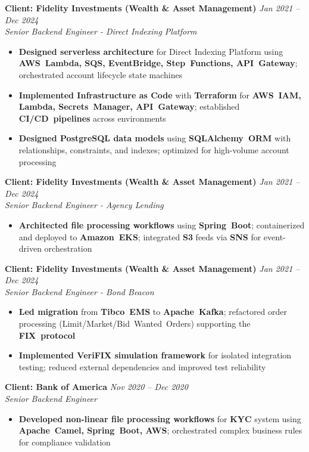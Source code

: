 \documentclass[11pt,a4paper]{article}
\newcommand{\resumeItem}[1]{\item\small{#1}}
\newcommand{\resumeItemList}[1]{\begin{itemize}[leftmargin=0.5in, itemsep=0.25em, parsep=0pt, partopsep=0pt, topsep=0.25em]
    \small
    #1
\end{itemize}}
\begin{document}
\textbf{Client: Fidelity Investments (Wealth \& Asset Management)} \hfill \textit{Jan 2021 -- Dec 2024}\\
\textit{Senior Backend Engineer - Direct Indexing Platform}
\resumeItemList{
    \resumeItem{\textbf{Designed serverless architecture} for Direct Indexing Platform using \textbf{AWS~Lambda, SQS, EventBridge, Step~Functions, API~Gateway}; orchestrated account lifecycle state machines}
    \resumeItem{\textbf{Implemented Infrastructure as Code} with \textbf{Terraform} for \textbf{AWS~IAM, Lambda, Secrets~Manager, API~Gateway}; established \textbf{CI/CD~pipelines} across environments}
    \resumeItem{\textbf{Designed PostgreSQL data models} using \textbf{SQLAlchemy~ORM} with relationships, constraints, and indexes; optimized for high-volume account processing}
}
\vspace{0.4em}

\textbf{Client: Fidelity Investments (Wealth \& Asset Management)} \hfill \textit{Jan 2021 -- Dec 2024}\\
\textit{Senior Backend Engineer - Agency Lending}
\resumeItemList{
    \resumeItem{\textbf{Architected file processing workflows} using \textbf{Spring~Boot}; containerized and deployed to \textbf{Amazon~EKS}; integrated \textbf{S3} feeds via \textbf{SNS} for event-driven orchestration}
}
\vspace{0.4em}

\textbf{Client: Fidelity Investments (Wealth \& Asset Management)} \hfill \textit{Jan 2021 -- Dec 2024}\\
\textit{Senior Backend Engineer - Bond Beacon}
\resumeItemList{
    \resumeItem{\textbf{Led migration} from \textbf{Tibco~EMS} to \textbf{Apache~Kafka}; refactored order processing (Limit/Market/Bid~Wanted~Orders) supporting the \textbf{FIX~protocol}}
    \resumeItem{\textbf{Implemented \textbf{VeriFIX} simulation framework} for isolated integration testing; reduced external dependencies and improved test reliability}
}
\vspace{0.4em}

\textbf{Client: Bank of America} \hfill \textit{Nov 2020 -- Dec 2020}\\
\textit{Senior Backend Engineer}
\resumeItemList{
    \resumeItem{\textbf{Developed non-linear file processing workflows} for \textbf{KYC} system using \textbf{Apache~Camel, Spring~Boot, AWS}; orchestrated complex business rules for compliance validation}
}
\end{document}
